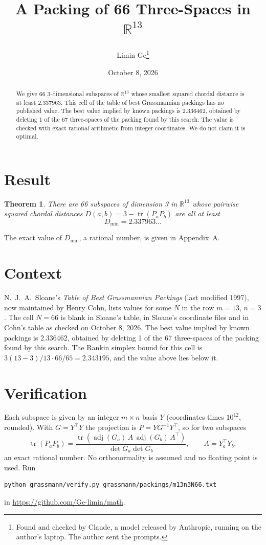 \documentclass[11pt,a4paper]{article}
\title{A Packing of 66 Three-Spaces in $\mathbb{R}^{13}$}
\author{Limin Ge\thanks{Found and checked by Claude, a model released by Anthropic, running on the author's laptop. The author sent the prompts.}}
\date{October 8, 2026}
\newtheorem*{theorem}{Theorem}
\begin{document}
\maketitle
\begin{abstract}
We give 66 3-dimensional subspaces of $\mathbb{R}^{13}$ whose smallest squared chordal distance is at least 2.337963. This cell of the table of best Grassmannian packings has no published value. The best value implied by known packings is 2.336462, obtained by deleting 1 of the 67 three-spaces of the packing found by this search. The value is checked with exact rational arithmetic from integer coordinates. We do not claim it is optimal.
\end{abstract}

\section{Result}
\begin{theorem}
There are 66 subspaces of dimension 3 in $\mathbb{R}^{13}$ whose pairwise squared chordal distances $D(a,b) = 3 - \operatorname{tr}(P_aP_b)$ are all at least
\[ D_{\min} = 2.337963\ldots \]
\end{theorem}
The exact value of $D_{\min}$, a rational number, is given in Appendix~A.


\section{Context}
N.~J.~A.~Sloane's \emph{Table of Best Grassmannian Packings} (last modified 1997), now maintained by Henry Cohn, lists values for some $N$ in the row $m=13$, $n=3$. The cell $N=66$ is blank in Sloane's table, in Sloane's coordinate files and in Cohn's table as checked on October 8, 2026. The best value implied by known packings is 2.336462, obtained by deleting 1 of the 67 three-spaces of the packing found by this search. The Rankin simplex bound for this cell is $3(13-3)/13\cdot 66/65 = 2.343195$, and the value above lies below it.


\section{Verification}
Each subspace is given by an integer $m\times n$ basis $Y$ (coordinates times $10^{12}$, rounded). With $G=Y^\top Y$ the projection is $P=YG^{-1}Y^\top$, so for two subspaces
\[ \operatorname{tr}(P_aP_b)=\frac{\operatorname{tr}(\operatorname{adj}(G_a)\,A\,\operatorname{adj}(G_b)\,A^\top)}{\det G_a\det G_b},\qquad A=Y_a^\top Y_b, \]
an exact rational number. No orthonormality is assumed and no floating point is used. Run
\begin{verbatim}
python grassmann/verify.py grassmann/packings/m13n3N66.txt
\end{verbatim}
in \url{https://github.com/Ge-limin/math}.
\end{document}
